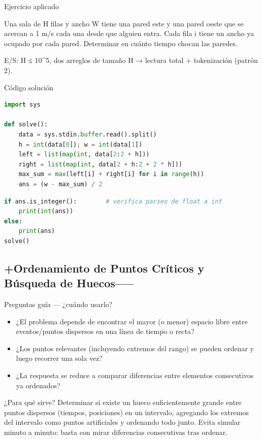 Ejercicio aplicado

Una sala de H filas y ancho W tiene una pared este y una pared oeste que se acercan a 1 m/s cada una desde que alguien entra. Cada fila i tiene un ancho ya ocupado por cada pared. Determinar en cuánto tiempo chocan las paredes.

E/S: H ≤ 10\textasciicircum{}5, dos arreglos de tamaño H → lectura total + tokenización (patrón 2).

Código solución

\begin{lstlisting}[language=Python]
import sys
 
def solve():
    data = sys.stdin.buffer.read().split()
    h = int(data[0]); w = int(data[1])
    left = list(map(int, data[2:2 + h]))
    right = list(map(int, data[2 + h:2 + 2 * h]))
    max_sum = max(left[i] + right[i] for i in range(h))
    ans = (w - max_sum) / 2
\end{lstlisting}


\begin{lstlisting}[language=Python]
if ans.is_integer():        # verifica parseo de float a int
    print(int(ans))
else:
    print(ans)
solve()
\end{lstlisting}


\subsection{+Ordenamiento de Puntos Críticos y Búsqueda de Huecos-----}

Preguntas guía — ¿cuándo usarlo?

\begin{itemize}
\item ¿El problema depende de encontrar el mayor (o menor) espacio libre entre eventos/puntos dispersos en una línea de tiempo o recta?
\item ¿Los puntos relevantes (incluyendo extremos del rango) se pueden ordenar y luego recorrer una sola vez?
\item ¿La respuesta se reduce a comparar diferencias entre elementos consecutivos ya ordenados?
\end{itemize}

¿Para qué sirve? Determinar si existe un hueco suficientemente grande entre puntos dispersos (tiempos, posiciones) en un intervalo, agregando los extremos del intervalo como puntos artificiales y ordenando todo junto. Evita simular minuto a minuto: basta con mirar diferencias consecutivas tras ordenar.

